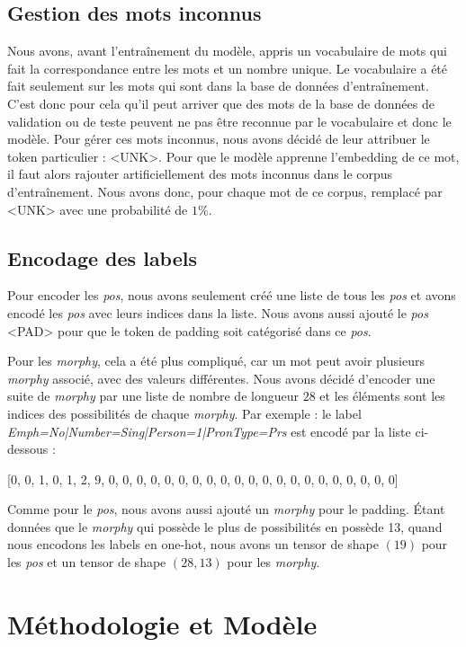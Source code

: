 \documentclass[a4paper]{article}
\begin{document}
\subsection{Gestion des mots inconnus}

Nous avons, avant l'entraînement du modèle, appris un vocabulaire de mots qui fait la correspondance entre les mots et un nombre unique.
Le vocabulaire a été fait seulement sur les mots qui sont dans la base de données d'entraînement. C'est donc pour cela qu'il peut
arriver que des mots de la base de données de validation ou de teste peuvent ne pas être reconnue par le vocabulaire et donc le modèle.
Pour gérer ces mots inconnus, nous avons décidé de leur attribuer le token particulier : <UNK>. Pour que le modèle
apprenne l'embedding de ce mot, il faut alors rajouter artificiellement des mots inconnus dans le corpus d'entraînement. Nous avons
donc, pour chaque mot de ce corpus, remplacé par <UNK> avec une probabilité de $1\%$.


\subsection{Encodage des labels}

Pour encoder les \textit{pos}, nous avons seulement créé une liste de tous les \textit{pos} et avons encodé les \textit{pos} avec leurs indices dans la liste.
Nous avons aussi ajouté le \textit{pos} <PAD> pour que le token de padding soit catégorisé dans ce \textit{pos}.


Pour les \textit{morphy}, cela a été plus compliqué, car un mot peut avoir plusieurs \textit{morphy} associé, avec des valeurs différentes. Nous avons 
décidé d'encoder une suite de \textit{morphy} par une liste de nombre de longueur $28$ et les éléments sont les indices des possibilités de chaque
\textit{morphy}. Par exemple : le label \textit{Emph=No|Number=Sing|Person=1|PronType=Prs} est encodé par la liste ci-dessous :

[0, 0, 1, 0, 1, 2, 9, 0, 0, 0, 0, 0, 0, 0, 0, 0, 0, 0, 0, 0, 0, 0, 0, 0, 0, 0, 0, 0]

Comme pour le \textit{pos}, nous avons aussi ajouté un \textit{morphy} pour le padding. Étant données que le \textit{morphy} qui possède
le plus de possibilités en possède 13, quand nous encodons les labels en one-hot, nous avons un tensor de shape
$(19)$ pour les \textit{pos} et un tensor de shape $(28, 13)$ pour les \textit{morphy}.


\section{Méthodologie et Modèle}
\end{document}
